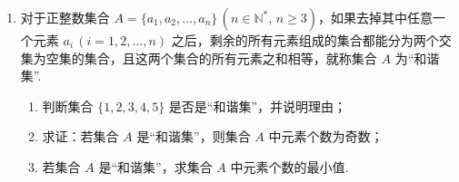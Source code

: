 \documentclass[a4paper,11pt]{article}
\begin{document}
\begin{enumerate}
\ifanswer
\solbegin
{}
\step{综上所述，实数 $a$ 的取值范围为 $(-\infty,-4]$.}
\solend

\fi
\ansspace[6]
\ansneed{7cm}
\item 对于正整数集合 $A=\{a_1,a_2,\dots,a_n\}\,(n\in\mathbb{N}^*,\,n\geqslant 3)$，如果去掉其中任意一个元素 $a_i\,(i=1,2,\dots,n)$ 之后，剩余的所有元素组成的集合都能分为两个交集为空集的集合，且这两个集合的所有元素之和相等，就称集合 $A$ 为“和谐集”.
\begin{enumerate}[label=(\arabic*)]
\item 判断集合 $\{1,2,3,4,5\}$ 是否是“和谐集”，并说明理由；
\item 求证：若集合 $A$ 是“和谐集”，则集合 $A$ 中元素个数为奇数；
\item 若集合 $A$ 是“和谐集”，求集合 $A$ 中元素个数的最小值.
\end{enumerate}



\end{enumerate}
\end{document}
